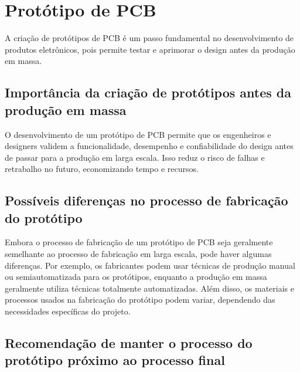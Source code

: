 \hypertarget{protuxf3tipo-de-pcb}{%
\chapter{Protótipo de PCB}\label{protuxf3tipo-de-pcb}}

A criação de protótipos de PCB é um passo fundamental no desenvolvimento de produtos eletrônicos, pois permite testar e aprimorar o design antes da produção em massa.

\hypertarget{importuxe2ncia-da-criauxe7uxe3o-de-protuxf3tipos-antes-da-produuxe7uxe3o-em-massa}{%
\section{Importância da criação de protótipos antes da produção em massa}\label{importuxe2ncia-da-criauxe7uxe3o-de-protuxf3tipos-antes-da-produuxe7uxe3o-em-massa}}

O desenvolvimento de um protótipo de PCB permite que os engenheiros e designers validem a funcionalidade, desempenho e confiabilidade do design antes de passar para a produção em larga escala. Isso reduz o risco de falhas e retrabalho no futuro, economizando tempo e recursos.

\hypertarget{possuxedveis-diferenuxe7as-no-processo-de-fabricauxe7uxe3o-do-protuxf3tipo}{%
\section{Possíveis diferenças no processo de fabricação do protótipo}\label{possuxedveis-diferenuxe7as-no-processo-de-fabricauxe7uxe3o-do-protuxf3tipo}}

Embora o processo de fabricação de um protótipo de PCB seja geralmente semelhante ao processo de fabricação em larga escala, pode haver algumas diferenças. Por exemplo, os fabricantes podem usar técnicas de produção manual ou semiautomatizada para os protótipos, enquanto a produção em massa geralmente utiliza técnicas totalmente automatizadas. Além disso, os materiais e processos usados na fabricação do protótipo podem variar, dependendo das necessidades específicas do projeto.

\hypertarget{recomendauxe7uxe3o-de-manter-o-processo-do-protuxf3tipo-pruxf3ximo-ao-processo-final}{%
\section{Recomendação de manter o processo do protótipo próximo ao processo final}\label{recomendauxe7uxe3o-de-manter-o-processo-do-protuxf3tipo-pruxf3ximo-ao-processo-final}}

